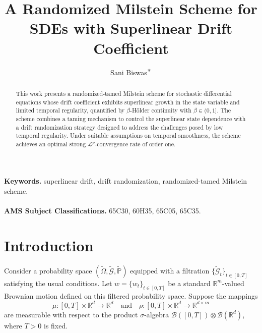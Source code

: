 \documentclass[reqno,  oneside, 12pt]{amsart}
\title[Randomized-tamed Milstein Scheme for SDEs]{A Randomized Milstein Scheme for  SDEs with Superlinear Drift Coefficient}
\author{Sani Biswas$^{\mbox{\textasteriskcentered}}$}
\begin{document}
	
	\begin{abstract}
		This work presents a randomized-tamed Milstein scheme for stochastic differential equations whose drift coefficient exhibits superlinear growth in the state variable and limited temporal regularity, quantified by $\beta$-H\"older continuity with $\beta \in (0,1]$. The scheme combines a taming mechanism to control the superlinear state dependence with a drift randomization strategy designed to address the challenges posed by low temporal regularity. Under suitable assumptions on temporal smoothness, the scheme achieves an optimal strong $\mathscr{L}^p$-convergence rate of order one.
		
		
		
		
		
		
		
		
	\end{abstract}
	
	\maketitle
	\noindent
	\textbf{Keywords.}    superlinear drift, drift randomization, randomized-tamed Milstein scheme.
	\\ \\
	\textbf{AMS Subject Classifications.}     65C30, 60H35, 65C05, 65C35.
\section{Introduction} \label{sec:intro}
Consider a probability space \((\tilde{\Omega}, \tilde{\mathscr{G}}, \tilde{\mathbb{P}})\) equipped with a filtration \(\{\tilde{\mathscr{G}}_t\}_{t \in [0,T]}\) satisfying the usual conditions. Let \( w = \{w_t\}_{t \in [0,T]} \) be a standard \(\mathbb{R}^m\)-valued Brownian motion defined on this filtered probability space.
Suppose the mappings
\[
\mu : [0,T] \times \mathbb{R}^d \to \mathbb{R}^d \quad \text{and} \quad \rho : [0,T] \times \mathbb{R}^d \to \mathbb{R}^{d \times m}
\]
are measurable with respect to the product \(\sigma\)-algebra \(\mathscr{B}([0,T]) \otimes \mathscr{B}(\mathbb{R}^d)\), where \( T > 0 \) is fixed.
\end{document}
